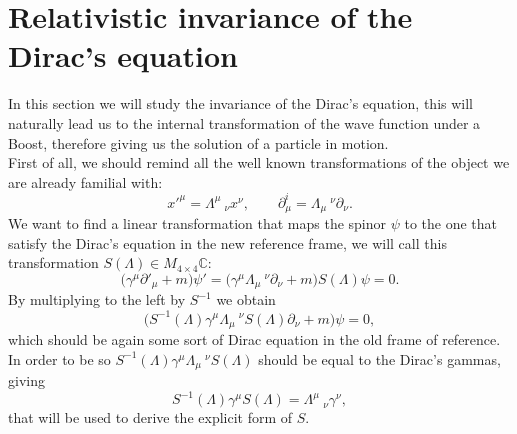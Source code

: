 \section{Relativistic invariance of the Dirac's equation}
In this section we will study the invariance of the Dirac's equation, this will naturally lead us to the internal transformation of the wave function under a Boost, therefore giving us the solution of a particle in motion.\\

First of all, we should remind all the well known transformations of the object we are already familial with:
\begin{equation*}
    x'^\mu=\Lambda^\mu\ _\nu x^\nu,\qquad\partial_\mu^i=\Lambda_\mu\ ^\nu\partial_\nu.
\end{equation*}
We want to find a linear transformation that maps the spinor $\psi$ to the one that satisfy the Dirac's equation in the new reference frame, we will call this transformation $S(\Lambda)\in M_{4\times4}\mathbb{C} $:
\begin{equation*}
    \big(\gamma^\mu\partial'_\mu+m\big)\psi'=\big(\gamma^\mu\Lambda_\mu\ ^\nu\partial_\nu+m\big)S(\Lambda)\psi=0.
\end{equation*}
By multiplying to the left by $S^{-1}$ we obtain
\begin{equation*}
   \big(S^{-1}(\Lambda)\gamma^\mu\Lambda_\mu\ ^\nu S(\Lambda)\partial_\nu+m\big)\psi=0,
\end{equation*}
which should be again some sort of Dirac equation in the old frame of reference. In order to be so $S^{-1}(\Lambda)\gamma^\mu\Lambda_\mu\ ^\nu S(\Lambda)$ should be equal to the Dirac's gammas, giving
\begin{equation*}
    S^{-1}(\Lambda)\gamma^\mu S(\Lambda)=\Lambda^\mu\ _\nu\gamma^\nu,
\end{equation*}
that will be used to derive the explicit form of $S$. \\


